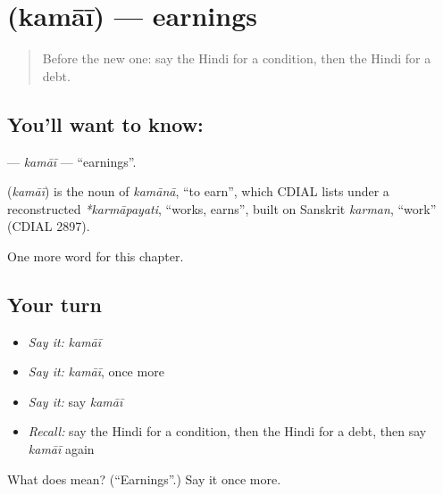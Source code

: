 \section[\texorpdfstring{\hi{कमाई} (kamāī)}{कमाई (kamāī)}]{ (kamāī) — earnings}

\label{lesson:HI-C207-kamai}



\begin{quote}
Before the new one: say the Hindi for a condition, then the Hindi for a debt.
\end{quote}

\subsection*{You'll want to know: }
\textbf{} — \emph{kamāī} — \textquotedblleft{}earnings\textquotedblright{}.

\begin{cousinweb}
\textbf{} (\emph{kamāī}) is the noun of \emph{kamānā}, \textquotedblleft{}to earn\textquotedblright{}, which CDIAL lists under a reconstructed \emph{*karmāpayati}, \textquotedblleft{}works, earns\textquotedblright{}, built on Sanskrit \emph{karman}, \textquotedblleft{}work\textquotedblright{} (CDIAL 2897).
\end{cousinweb}

\begin{grammarlens}[title={What you've built}]
One more word for this chapter.
\end{grammarlens}

\subsection*{Your turn}
\begin{itemize}
\raggedright
  \item \emph{Say it:} \emph{kamāī}
  \item \emph{Say it:} \emph{kamāī}, once more
  \item \emph{Say it:} say \emph{kamāī}
  \item \emph{Recall:} say the Hindi for a condition, then the Hindi for a debt, then say \emph{kamāī} again
\end{itemize}

\begin{tcolorbox}[breakable,colback=teal!4,colframe=teal!35!black,title={Before you move on}]
What does  mean? (\textquotedblleft{}Earnings\textquotedblright{}.) Say it once more.
\end{tcolorbox}

